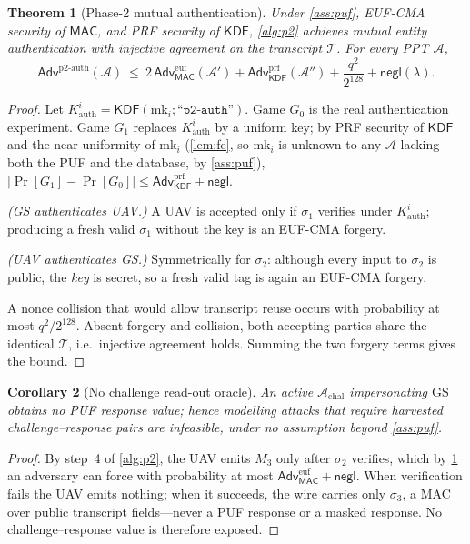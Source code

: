 \documentclass[11pt,a4paper]{article}
\theoremstyle{jrnlplain}
\newtheorem{theorem}{Theorem}
\newtheorem{corollary}[theorem]{Corollary}
\theoremstyle{jrnldef}
\newcommand{\GS}{\mathrm{GS}}
\newcommand{\mk}{\mathrm{mk}}
\newcommand{\MAC}{\mathsf{MAC}}
\newcommand{\KDF}{\mathsf{KDF}}
\newcommand{\adv}{\mathcal{A}}
\newcommand{\secpar}{\lambda}
\newcommand{\negl}{\mathsf{negl}}
\newcommand{\Adv}{\mathsf{Adv}}
\newcommand{\lbl}[1]{\text{``}\texttt{#1}\text{''}}
\newcommand{\transcript}{\mathcal{T}}
\begin{document}
\begin{theorem}[Phase-2 mutual authentication]\label{thm:p2}
Under \cref{ass:puf}, EUF-CMA security of $\MAC$, and PRF security of $\KDF$,
\cref{alg:p2} achieves mutual entity authentication with injective agreement
on the transcript $\transcript$. For every PPT $\adv$,
\begin{equation}
\Adv^{\mathrm{p2\text{-}auth}}(\adv)\ \le\
2\,\Adv^{\mathrm{euf}}_{\MAC}(\adv')
+\Adv^{\mathrm{prf}}_{\KDF}(\adv'')
+\frac{q^2}{2^{128}}
+\negl(\secpar).
\end{equation}
\end{theorem}
\begin{proof}
Let $K^{i}_{\mathrm{auth}}=\KDF(\mk_i;\lbl{p2-auth})$. Game $G_0$ is the real
authentication experiment. Game $G_1$ replaces $K^{i}_{\mathrm{auth}}$ by a
uniform key; by PRF security of $\KDF$ and the near-uniformity of $\mk_i$
(\cref{lem:fe}, so $\mk_i$ is unknown to any $\adv$ lacking both the PUF and
the database, by \cref{ass:puf}),
$|\Pr[G_1]-\Pr[G_0]|\le\Adv^{\mathrm{prf}}_{\KDF}+\negl$.

\emph{(GS authenticates UAV.)} A UAV is accepted only if $\sigma_1$ verifies
under $K^{i}_{\mathrm{auth}}$; producing a fresh valid $\sigma_1$ without the
key is an EUF-CMA forgery.

\emph{(UAV authenticates GS.)} Symmetrically for $\sigma_2$: although every
input to $\sigma_2$ is public, the \emph{key} is secret, so a fresh valid tag
is again an EUF-CMA forgery.

A nonce collision that would allow transcript reuse occurs with probability at
most $q^2/2^{128}$. Absent forgery and collision, both accepting parties share
the identical $\transcript$, i.e.\ injective agreement holds. Summing the two
forgery terms gives the bound.
\end{proof}

\begin{corollary}[No challenge read-out oracle]\label{cor:nooracle}
An active $\adv_{\mathrm{chal}}$ impersonating $\GS$ obtains no PUF response
value; hence modelling attacks that require harvested challenge--response
pairs are infeasible, under no assumption beyond \cref{ass:puf}.
\end{corollary}
\begin{proof}
By step~4 of \cref{alg:p2}, the UAV emits $M_3$ only after $\sigma_2$
verifies, which by \cref{thm:p2} an adversary can force with probability at
most $\Adv^{\mathrm{euf}}_{\MAC}+\negl$. When verification fails the UAV emits
nothing; when it succeeds, the wire carries only $\sigma_3$, a MAC over public
transcript fields---never a PUF response or a masked response. No
challenge--response value is therefore exposed.
\end{proof}
\end{document}
